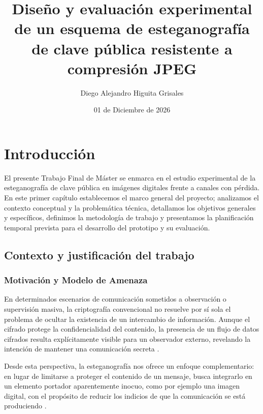 \documentclass[IB]{TFUOC}%
\title{Diseño y evaluación experimental de un esquema de esteganografía de clave pública resistente a compresión JPEG}
\author{Diego Alejandro Higuita Grisales}
\date{01 de Diciembre de 2026}
\begin{document}
\estructura

\tableofcontents
\newpage
\begingroup
\let\clearpage\relax
\listoffigures
\listoftables
\endgroup




\chapter{Introducción}
\label{chap:introduccion}

El presente Trabajo Final de Máster se enmarca en el estudio experimental de la esteganografía de clave pública en imágenes digitales frente a canales con pérdida. En este primer capítulo establecemos el marco general del proyecto; analizamos el contexto conceptual y la problemática técnica, detallamos los objetivos generales y específicos, definimos la metodología de trabajo y presentamos la planificación temporal prevista para el desarrollo del prototipo y su evaluación.

\section{Contexto y justificación del trabajo}
\label{sec:contexto_justificacion}

\subsection{Motivación y Modelo de Amenaza}
En determinados escenarios de comunicación sometidos a observación o supervisión masiva, la criptografía convencional no resuelve por sí sola el problema de ocultar la existencia de un intercambio de información. Aunque el cifrado protege la confidencialidad del contenido, la presencia de un flujo de datos cifrados resulta explícitamente visible para un observador externo, revelando la intención de mantener una comunicación secreta \cite{5,3}.

Desde esta perspectiva, la esteganografía nos ofrece un enfoque complementario: en lugar de limitarse a proteger el contenido de un mensaje, busca integrarlo en un elemento portador aparentemente inocuo, como por ejemplo una imagen digital, con el propósito de reducir los indicios de que la comunicación se está produciendo \cite{5}. 
\end{document}
